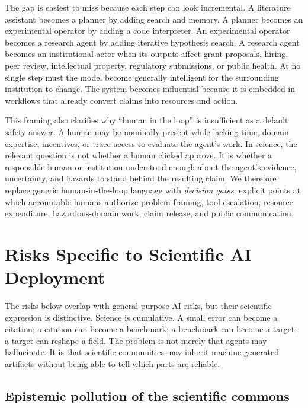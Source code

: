 \documentclass{article}
\begin{document}
The gap is easiest to miss because each step can look incremental. A literature assistant becomes a planner by adding search and memory. A planner becomes an experimental operator by adding a code interpreter. An experimental operator becomes a research agent by adding iterative hypothesis search. A research agent becomes an institutional actor when its outputs affect grant proposals, hiring, peer review, intellectual property, regulatory submissions, or public health. At no single step must the model become generally intelligent for the surrounding institution to change. The system becomes influential because it is embedded in workflows that already convert claims into resources and action.

This framing also clarifies why ``human in the loop'' is insufficient as a default safety answer. A human may be nominally present while lacking time, domain expertise, incentives, or trace access to evaluate the agent's work. In science, the relevant question is not whether a human clicked approve. It is whether a responsible human or institution understood enough about the agent's evidence, uncertainty, and hazards to stand behind the resulting claim. We therefore replace generic human-in-the-loop language with \emph{decision gates}: explicit points at which accountable humans authorize problem framing, tool escalation, resource expenditure, hazardous-domain work, claim release, and public communication.

\section{Risks Specific to Scientific AI Deployment}

The risks below overlap with general-purpose AI risks, but their scientific expression is distinctive. Science is cumulative. A small error can become a citation; a citation can become a benchmark; a benchmark can become a target; a target can reshape a field. The problem is not merely that agents may hallucinate. It is that scientific communities may inherit machine-generated artifacts without being able to tell which parts are reliable.

\subsection{Epistemic pollution of the scientific commons}
\end{document}
